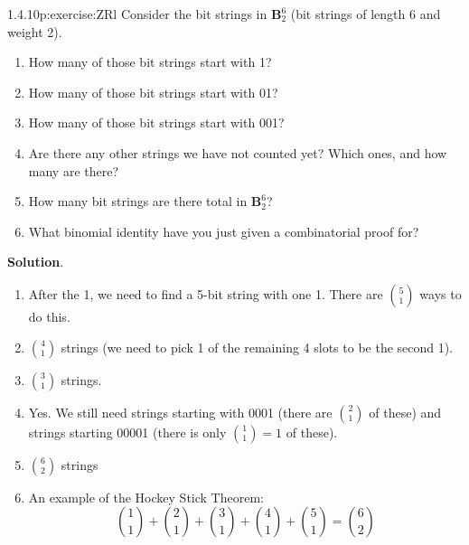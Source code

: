 \documentclass[twoside,11pt,]{book}
\newcommand{\blocktitlefont}{\relax}
\numberwithin{equation}{chapter}
\newcommand{\B}{\mathbf B}
\begin{document}
\begin{divisionsolution}{1.4.10}{}{p:exercise:ZRl}%
Consider the bit strings in \(\B^6_2\) (bit strings of length 6 and weight 2).%
%
\begin{enumerate}[label=(\alph*)]
\item{}How many of those bit strings start with 1?%
\item{}How many of those bit strings start with 01?%
\item{}How many of those bit strings start with 001?%
\item{}Are there any other strings we have not counted yet? Which ones, and how many are there?%
\item{}How many bit strings are there total in \(\B^6_2\)?%
\item{}What binomial identity have you just given a combinatorial proof for?%
\end{enumerate}
\par\smallskip%
\noindent\textbf{\blocktitlefont Solution}.\quad{}%
\begin{enumerate}[label=(\alph*)]
\item{}After the 1, we need to find a 5-bit string with one 1. There are \({5 \choose 1}\) ways to do this.%
\item{}\({4 \choose 1}\) strings (we need to pick 1 of the remaining 4 slots to be the second 1).%
\item{}\({3 \choose 1}\) strings.%
\item{}Yes. We still need strings starting with 0001 (there are \({2 \choose 1}\) of these) and strings starting 00001 (there is only \({1 \choose 1} = 1\) of these).%
\item{}\({6 \choose 2}\) strings%
\item{}An example of the Hockey Stick Theorem:%
\begin{equation*}
{1 \choose 1} + {2 \choose 1} + {3 \choose 1} + {4 \choose 1} + {5 \choose 1} = {6 \choose 2}
\end{equation*}
%
\end{enumerate}
%
\end{divisionsolution}%
\end{document}
